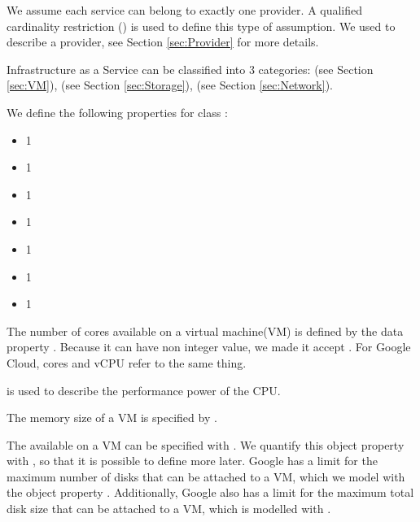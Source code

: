 We assume each service can belong to exactly one provider.
A qualified cardinality restriction  () is used to define this type of assumption.
We used  to describe a provider, see Section \ref{sec:Provider} for more details.

\label{sec:IaaS}
Infrastructure as a Service can be classified into 3 categories:
 (see Section \ref{sec:VM}),
 (see Section \ref{sec:Storage}),
 (see Section \ref{sec:Network}).

\label{sec:VM}
We define the following properties for class :
\begin{itemize}
  \item[]   1 
  \item[]   1 
  \item[]   1 
  \item[]   1 
  \item[]   1 
  \item[]   1 
  \item[]   1 
\end{itemize}

The number of cores available on a virtual machine(VM) is defined by the data property .
Because it can have non integer value, we made it accept .
For Google Cloud, cores and vCPU refer to the same thing.

 is used to describe the performance power of the CPU.

The memory size of a VM is specified by .

The  available on a VM can be specified with .
We quantify this object property with , so that it is possible to define more  later.
Google has a limit for the maximum number of disks that can be attached to a VM, which we model with the object property .
Additionally, Google also has a limit for the maximum total disk size that can be attached to a VM, which is modelled with .

